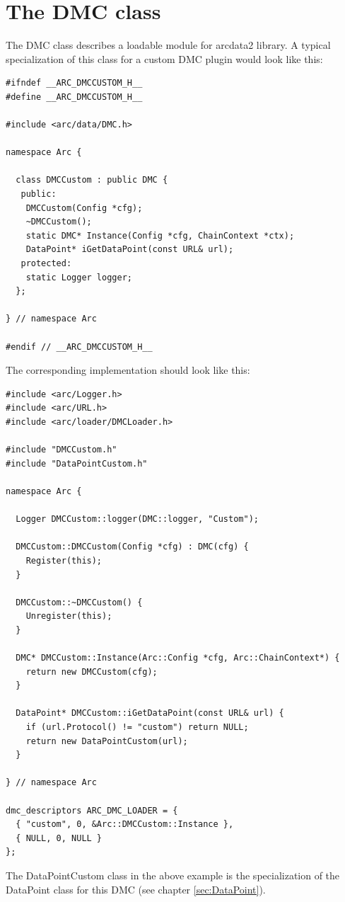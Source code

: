\documentclass{book}
\begin{document}
\chapter{The DMC class}
\label{sec:DMC}

The DMC class describes a loadable module for arcdata2 library. A
typical specialization of this class for a custom DMC plugin would
look like this:

\begin{verbatim}
#ifndef __ARC_DMCCUSTOM_H__
#define __ARC_DMCCUSTOM_H__

#include <arc/data/DMC.h>

namespace Arc {

  class DMCCustom : public DMC {
   public:
    DMCCustom(Config *cfg);
    ~DMCCustom();
    static DMC* Instance(Config *cfg, ChainContext *ctx);
    DataPoint* iGetDataPoint(const URL& url);
   protected:
    static Logger logger;
  };

} // namespace Arc

#endif // __ARC_DMCCUSTOM_H__
\end{verbatim}

The corresponding implementation should look like this:

\begin{verbatim}
#include <arc/Logger.h>
#include <arc/URL.h>
#include <arc/loader/DMCLoader.h>

#include "DMCCustom.h"
#include "DataPointCustom.h"

namespace Arc {

  Logger DMCCustom::logger(DMC::logger, "Custom");

  DMCCustom::DMCCustom(Config *cfg) : DMC(cfg) {
    Register(this);
  }

  DMCCustom::~DMCCustom() {
    Unregister(this);
  }

  DMC* DMCCustom::Instance(Arc::Config *cfg, Arc::ChainContext*) {
    return new DMCCustom(cfg);
  }

  DataPoint* DMCCustom::iGetDataPoint(const URL& url) {
    if (url.Protocol() != "custom") return NULL;
    return new DataPointCustom(url);
  }

} // namespace Arc

dmc_descriptors ARC_DMC_LOADER = {
  { "custom", 0, &Arc::DMCCustom::Instance },
  { NULL, 0, NULL }
};
\end{verbatim}

The DataPointCustom class in the above example is the specialization
of the DataPoint class for this DMC (see chapter \ref{sec:DataPoint}).
\end{document}
